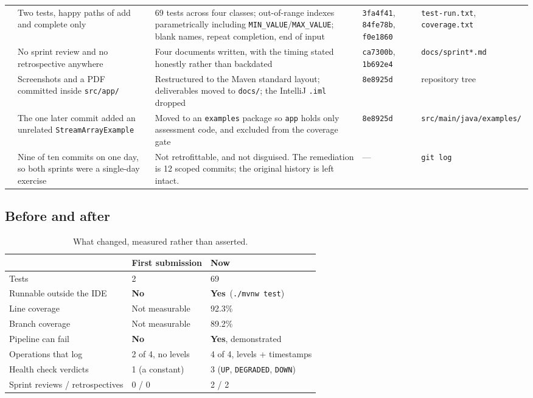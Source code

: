 \documentclass[11pt,a4paper]{article}
\newcommand{\yes}{\textcolor{good}{\textbf{Yes}}}
\newcommand{\no}{\textcolor{bad}{\textbf{No}}}
\newcommand{\code}[1]{\texttt{\small #1}}
\begin{document}
\begin{longtable}{@{}c L{4.5cm} L{5.3cm} l L{2.7cm}@{}}
 & Two tests, happy paths of add and complete only & 69 tests across four classes; out-of-range indexes parametrically including \code{MIN\_VALUE}/\code{MAX\_VALUE}; blank names, repeat completion, end of input & \code{3fa4f41}, \code{84fe78b}, \code{f0e1860} & \code{test-run.txt}, \code{coverage.txt} \\
 & No sprint review and no retrospective anywhere & Four documents written, with the timing stated honestly rather than backdated & \code{ca7300b}, \code{1b692e4} & \code{docs/sprint*.md} \\
 & Screenshots and a PDF committed inside \code{src/app/} & Restructured to the Maven standard layout; deliverables moved to \code{docs/}; the IntelliJ \code{.iml} dropped & \code{8e8925d} & repository tree \\
 & The one later commit added an unrelated \code{StreamArrayExample} & Moved to an \code{examples} package so \code{app} holds only assessment code, and excluded from the coverage gate & \code{8e8925d} & \code{src/main/java/\allowbreak examples/} \\
 & Nine of ten commits on one day, so both sprints were a single-day exercise & Not retrofittable, and not disguised. The remediation is 12 scoped commits; the original history is left intact. & --- & \code{git log} \\
\end{longtable}

\subsection{Before and after}

\begin{table}[h]
\centering
\small
\begin{tabularx}{\textwidth}{@{}X l l@{}}
\toprule
& \textbf{First submission} & \textbf{Now} \\
\midrule
Tests & 2 & 69 \\
Runnable outside the IDE & \no & \yes\ (\code{./mvnw test}) \\
Line coverage & Not measurable & 92.3\% \\
Branch coverage & Not measurable & 89.2\% \\
Pipeline can fail & \no & \yes, demonstrated \\
Operations that log & 2 of 4, no levels & 4 of 4, levels + timestamps \\
Health check verdicts & 1 (a constant) & 3 (\code{UP}, \code{DEGRADED}, \code{DOWN}) \\
Sprint reviews / retrospectives & 0 / 0 & 2 / 2 \\
\bottomrule
\end{tabularx}
\caption{What changed, measured rather than asserted.}
\end{table}
\end{document}
